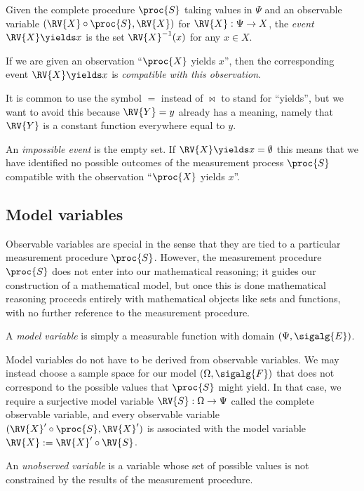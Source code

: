 \begin{definition}[Event]
Given the complete procedure $\proc{S}$ taking values in $\Psi$ and an observable variable $(\RV{X}\circ \proc{S},\RV{X})$ for $\RV{X}:\Psi\to X$, the \emph{event} $\RV{X}\yields x$ is the set $\RV{X}^{-1}(x)$ for any $x\in X$.
\end{definition}

If we are given an observation ``$\proc{X}$ yields $x$'', then the corresponding event $\RV{X}\yields x$ is \emph{compatible with this observation}.

It is common to use the symbol $=$ instead of $\bowtie$ to stand for ``yields'', but we want to avoid this because $\RV{Y}=y$ already has a meaning, namely that $\RV{Y}$ is a constant function everywhere equal to $y$.

An \emph{impossible event} is the empty set. If $\RV{X}\yields x=\emptyset$ this means that we have identified no possible outcomes of the measurement process $\proc{S}$ compatible with the observation ``$\proc{X}$ yields $x$''. 

\subsection{Model variables}

Observable variables are special in the sense that they are tied to a particular measurement procedure $\proc{S}$. However, the measurement procedure $\proc{S}$ does not enter into our mathematical reasoning; it guides our construction of a mathematical model, but once this is done mathematical reasoning proceeds entirely with mathematical objects like sets and functions, with no further reference to the measurement procedure.

A \emph{model variable} is simply a measurable function with domain $(\Psi,\sigalg{E})$.

Model variables do not have to be derived from observable variables. We may instead choose a sample space for our model $(\Omega,\sigalg{F})$ that does not correspond to the possible values that $\proc{S}$ might yield. In that case, we require a surjective model variable $\RV{S}:\Omega\to \Psi$ called the complete observable variable, and every observable variable $(\RV{X}'\circ \proc{S},\RV{X}')$ is associated with the model variable $\RV{X}:=\RV{X}'\circ \RV{S}$.

An \emph{unobserved variable} is a variable whose set of possible values is not constrained by the results of the measurement procedure.

